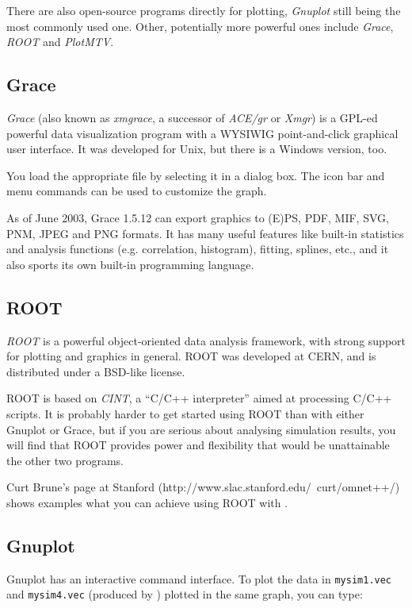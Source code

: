 There are also open-source programs directly for plotting, \textit{Gnuplot}
still being the most commonly used one. Other, potentially more powerful ones
include \textit{Grace}, \textit{ROOT} and \textit{PlotMTV}.


\subsection{Grace}

\textit{Grace} (also known as \textit{xmgrace}, a successor of \textit{ACE/gr} or
\textit{Xmgr}) is a GPL-ed powerful data visualization program
with a WYSIWIG point-and-click graphical user interface. It was developed for
Unix, but there is a Windows version, too.

You load the appropriate file by selecting it in a dialog box.
The icon bar and menu commands can be used to customize the graph.

As of June 2003, Grace 1.5.12 can export graphics to (E)PS, PDF, MIF, SVG,
PNM, JPEG and PNG formats. It has many useful features like built-in statistics
and analysis functions (e.g. correlation, histogram), fitting, splines, etc.,
and it also sports its own built-in programming language.


\subsection{ROOT}

\textit{ROOT} is a powerful object-oriented data analysis framework,
with strong support for plotting and graphics in general.
ROOT was developed at CERN, and is distributed under a BSD-like license.

ROOT is based on \textit{CINT}, a ``C/C++ interpreter''
aimed at processing C/C++ scripts. It is probably harder to get started
using ROOT than with either Gnuplot or Grace, but if you are serious
about analysing simulation results, you will find that ROOT provides
power and flexibility that would be unattainable the other two programs.

Curt Brune's page at Stanford (http://www.slac.stanford.edu/~curt/omnet++/)
shows examples what you can achieve using ROOT with {\opp}.


\subsection{Gnuplot}

Gnuplot has an interactive command interface. To plot the data in
\texttt{mysim1.vec} and \texttt{mysim4.vec} (produced by )
plotted in the same graph, you can type:

